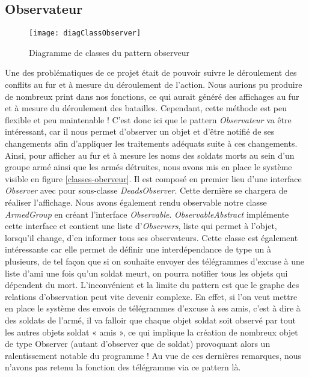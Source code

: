 \subsection{Observateur}
\begin{figure}[h]
\begin{center}
    \texttt{[image: diagClassObserver]}
\end{center}
    \caption{Diagramme de classes du pattern observeur}
    \label{classes-oberveur}
\end{figure}

Une des problématiques de ce projet était de pouvoir suivre le déroulement des conflits au fur et à mesure du déroulement de l’action. Nous aurions pu produire de nombreux print dans nos fonctions, ce qui aurait généré des affichages au fur et à mesure du déroulement des batailles. Cependant, cette méthode est peu flexible et peu maintenable ! 
C'est donc ici que le pattern \emph{Observateur} va être intéressant, car il nous permet d'observer un objet et d'être notifié de ses changements afin d'appliquer les traitements adéquats suite à ces changements. 
Ainsi, pour afficher au fur et à mesure les noms des soldats morts au sein d'un groupe armé ainsi que les armés détruites, nous avons mis en place le système visible en figure \vref{classes-oberveur}. Il est composé en premier lieu d'une interface \emph{Observer} avec pour sous-classe \emph{DeadsObserver}. Cette dernière se chargera de réaliser l'affichage. Nous avons également rendu observable notre classe \emph{ArmedGroup} en créant l'interface \emph{Observable}. \emph{ObservableAbstract} implémente cette interface et contient une liste d'\emph{Observers}, liste qui permet à l'objet, lorsqu'il change, d'en informer tous ses observateurs. 
Cette classe est également intéressante car elle permet de définir une interdépendance de type un à plusieurs, de tel façon que si on souhaite envoyer des télégrammes d’excuse à une liste d'ami une fois qu'un soldat meurt, on pourra notifier tous les objets qui dépendent du mort. L'inconvénient et la limite du pattern est que le graphe des relations d'observation peut vite devenir complexe. En effet, si l'on veut mettre en place le système des envois de télégrammes d’excuse à ses amis, c'est à dire à des soldats de l'armé, il va falloir que chaque objet soldat soit observé par tout les autres objets soldat « amis », ce qui implique la création de nombreux objet de type Observer (autant d'observer que de soldat) provoquant alors un ralentissement notable du programme ! Au vue de ces dernières remarques, nous n'avons pas retenu la fonction des télégramme via ce pattern là.
